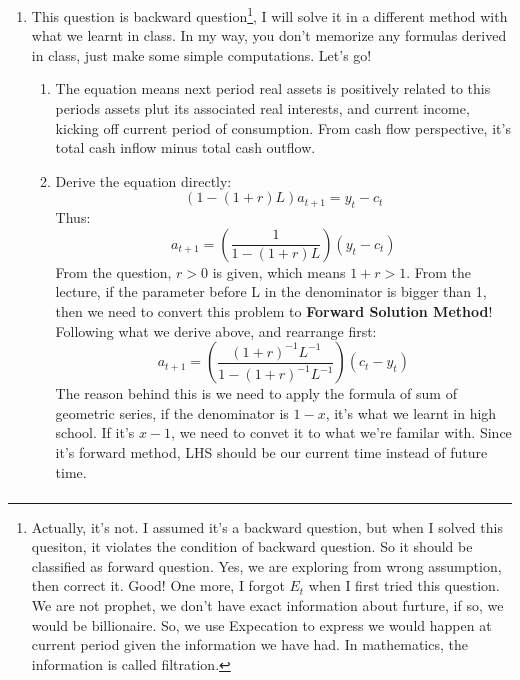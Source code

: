 \documentclass[11pt]{article} %
\begin{document}
\begin{enumerate}
    \item This question is backward question\footnote{Actually, it's not. I assumed it's a backward question, but when I solved this quesiton, it violates the condition of backward question. So it should be classified as forward question. Yes, we are exploring from wrong assumption, then correct it. Good! One more, I forgot $E_t$ when I first tried this question. We are not prophet, we don't have exact information about furture, if so, we would be billionaire. So, we use Expecation to express 
    we would happen at current period given the information we have had. In mathematics, the information is called filtration. }, I will solve it in a different method with what we learnt in class. In my way, you don't memorize any formulas derived in class, just make some simple computations. Let's go!
    \begin{enumerate}
        \item The equation means next period real assets is positively related to this periods assets plut its associated real interests, and current income, kicking off current period of consumption. From cash flow perspective,
         it's total cash inflow minus total cash outflow.
        \item Derive the equation directly:
            \begin{equation*}
                (1-(1+r)L)a_{t+1}=y_t-c_t
            \end{equation*}
        Thus:
            \begin{equation*}
                a_{t+1}= (\frac{1}{1-(1+r)L})(y_t-c_t)
            \end{equation*}
            From the question, $r>0$ is given, which means $1+r >1$. From the lecture, if the parameter before L in the 
            denominator is bigger than 1, then we need to convert this problem to \textbf{Forward Solution Method}!
            Following what we derive above, and rearrange first:
             \begin{equation*}
                 a_{t+1}=(\frac{(1+r)^{-1}L^{-1}}{1-(1+r)^{-1}L^{-1}})(c_t-y_t)
             \end{equation*}
             The reason behind this is we need to apply the formula of sum of geometric series, if the denominator is $1-x$, it's what we learnt in high school. If it's $x-1$, we need to convet it to what we're familar with. 
             Since it's forward method, LHS should be our current time instead of future time.
             \begin{align*}

\end{align*}
\end{enumerate}
\end{enumerate}
\end{document}
